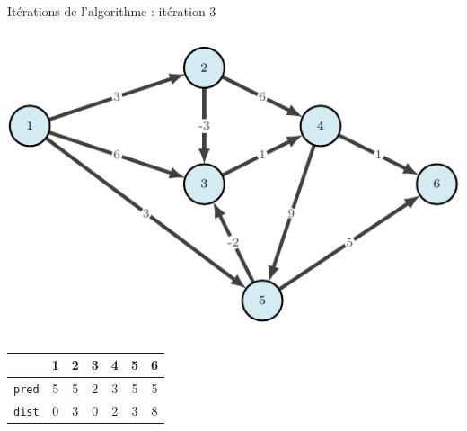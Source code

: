 \begin{frame}{Itérations de l'algorithme : itération 3}
    \begin{center}
        \includegraphics[height=.6\textheight]{fig/bellmann-0.pdf}      
    \begin{tabular}{c|cccccc}
      
        & 1    &2      &3      &4      &5      &6      \\
        \hline
        \texttt{pred} &5        &5      &2      &3      &5      &5      \\
        \texttt{dist} & 0       &3      &0      &2      &3      &8      \\
            \end{tabular}
\end{center}
\end{frame}


